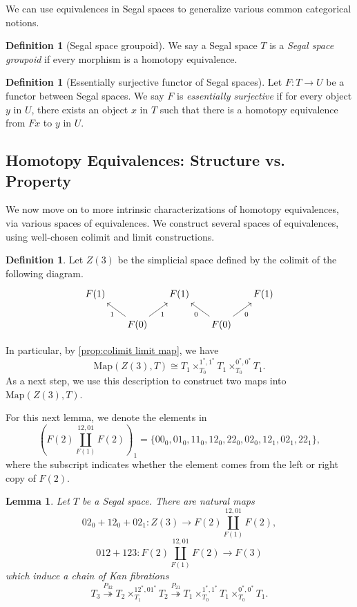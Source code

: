 \documentclass[11pt, a4paper]{amsart}
\newcommand{\Map}{\mathrm{Map}}
\newtheorem{lemma}[equation]{Lemma}
\theoremstyle{definition}
\newtheorem{definition}[equation]{Definition}
\theoremstyle{remark}
\numberwithin{equation}{section}
\begin{document}
We can use equivalences in Segal spaces to generalize various common categorical notions.
 
 \begin{definition}[Segal space groupoid] \label{def:segal space groupoid}
  We say a Segal space $T$ is a \emph{Segal space groupoid} if every morphism is a homotopy equivalence.
 \end{definition}

\begin{definition}[Essentially surjective functor of Segal spaces] \label{def:essentially surjective segal}
  Let $F\colon T \to U$ be a functor between Segal spaces. We say $F$ is \emph{essentially surjective} if for every object $y$ in $U$, there exists an object $x$ in $T$ such that there is a homotopy equivalence from $Fx$ to $y$ in $U$.
\end{definition}

\subsection{Homotopy Equivalences: Structure vs. Property}
We now move on to more intrinsic characterizations of homotopy equivalences, via various spaces of equivalences. We construct several spaces of equivalences, using well-chosen colimit and limit constructions.

\begin{definition} \label{def:z3}
 Let $Z(3)$ be the simplicial space defined by the colimit of the following diagram.
 \[
  \begin{tikzcd}[row sep=.5cm, column sep=0.5cm]
   F(1) & & F(1) & & F(1) \\
   & F(0) \arrow[ur, "1"'] \arrow[ul, "1"]& & F(0) \arrow[ur, "0"'] \arrow[ul, "0"]& 
  \end{tikzcd}
  \]
\end{definition}

In particular, by \cref{prop:colimit limit map}, we have 
\[\Map(Z(3), T) \cong T_1 {\times}^{1^*,1^*}_{T_0} T_1 {\times}^{0^*,0^*}_{T_0} T_1.\]
As a next step, we use this description to construct two maps into $\Map(Z(3),T)$.
 
For this next lemma, we denote the elements in 
\[(F(2) \coprod_{F(1)}^{12,01} F(2))_1 = \{00_0,01_0,11_0,12_0,22_0,02_0,12_1,02_1,22_1\},\]
where the subscript indicates whether the element comes from the left or right copy of $F(2)$.
 
\begin{lemma} \label{lemma:zthree in fthree}
  Let $T$ be a Segal space. There are natural maps
  \[ 02_0 + 12_0 + 02_1\colon Z(3) \to F(2) \coprod_{F(1)}^{12,01} F(2),\]
  \[ 012 + 123 \colon F(2) \coprod_{F(1)}^{12,01} F(2) \to F(3)\]
  which induce a chain of Kan fibrations
  \[ T_3 \overset{P_{32}}{\twoheadrightarrow}  T_2 \times_{T_1}^{12^*,01^*} T_2 \overset{P_{21}}{\twoheadrightarrow}  T_1 \times^{1^*,1^*}_{T_0} T_1 \times^{0^*,0^*}_{T_0} T_1.\]
\end{lemma}
\end{document}
